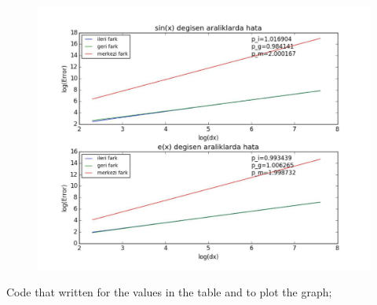 \documentclass[paper=a4, fontsize=11pt]{scrartcl} %
\newif\ifcomment
\numberwithin{equation}{section} %
\numberwithin{figure}{section} %
\numberwithin{table}{section} %
\begin{document}
\begin{figure}[h]
\centering
\includegraphics[scale=0.5]{graph1}
\end{figure}

\ifcomment
Code that written for the values in the table and to plot the graph;
\end{document}
